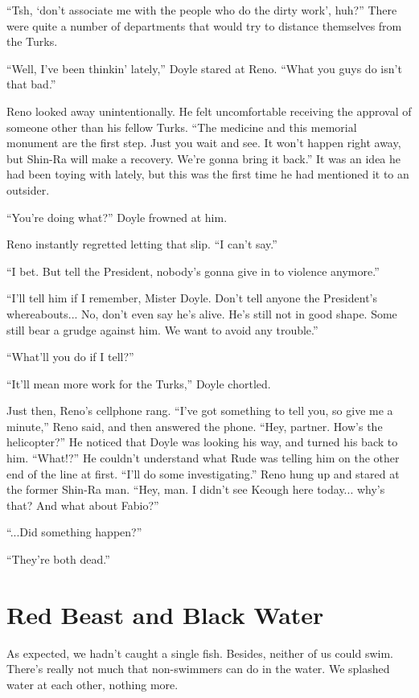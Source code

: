 \documentclass[oneside]{book}
\begin{document}
“Tsh, ‘don’t associate me with the people who do the dirty work’, huh?” There were quite a number of departments that would try to distance themselves from the Turks.

“Well, I’ve been thinkin’ lately,” Doyle stared at Reno. “What you guys do isn’t that bad.”

Reno looked away unintentionally. He felt uncomfortable receiving the approval of someone other than his fellow Turks. “The medicine and this memorial monument are the first step. Just you wait and see. It won’t happen right away, but Shin-Ra will make a recovery. We’re gonna bring it back.” It was an idea he had been toying with lately, but this was the first time he had mentioned it to an outsider.

“You’re doing what?” Doyle frowned at him.

Reno instantly regretted letting that slip. “I can’t say.”

“I bet. But tell the President, nobody’s gonna give in to violence anymore.”

“I’ll tell him if I remember, Mister Doyle. Don’t tell anyone the President’s whereabouts... No, don’t even say he’s alive. He’s still not in good shape. Some still bear a grudge against him. We want to avoid any trouble.”

“What’ll you do if I tell?”

“It’ll mean more work for the Turks,” Doyle chortled.

Just then, Reno’s cellphone rang. “I’ve got something to tell you, so give me a minute,” Reno said, and then answered the phone. “Hey, partner. How’s the helicopter?” He noticed that Doyle was looking his way, and turned his back to him. “What!?” He couldn’t understand what Rude was telling him on the other end of the line at first. “I’ll do some investigating.” Reno hung up and stared at the former Shin-Ra man. “Hey, man. I didn’t see Keough here today... why’s that? And what about Fabio?”

“...Did something happen?”

“They’re both dead.”

\chapter{Red Beast and Black Water}
As expected, we hadn’t caught a single fish. Besides, neither of us could swim. There’s really not much that non-swimmers can do in the water. We splashed water at each other, nothing more.
\end{document}
